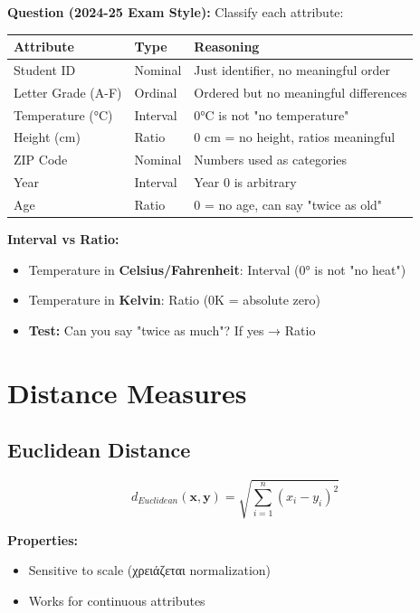 \begin{examplebox}
\textbf{Question (2024-25 Exam Style):} Classify each attribute:

\begin{center}
\begin{tabular}{lll}
\toprule
\textbf{Attribute} & \textbf{Type} & \textbf{Reasoning} \\
\midrule
Student ID & Nominal & Just identifier, no meaningful order \\
Letter Grade (A-F) & Ordinal & Ordered but no meaningful differences \\
Temperature (°C) & Interval & 0°C is not "no temperature" \\
Height (cm) & Ratio & 0 cm = no height, ratios meaningful \\
ZIP Code & Nominal & Numbers used as categories \\
Year & Interval & Year 0 is arbitrary \\
Age & Ratio & 0 = no age, can say "twice as old" \\
\bottomrule
\end{tabular}
\end{center}
\end{examplebox}

\begin{warningbox}
\textbf{Interval vs Ratio:}
\begin{itemize}
    \item Temperature in \textbf{Celsius/Fahrenheit}: Interval (0° is not "no heat")
    \item Temperature in \textbf{Kelvin}: Ratio (0K = absolute zero)
    \item \textbf{Test:} Can you say "twice as much"? If yes → Ratio
\end{itemize}
\end{warningbox}

\section{Distance Measures}

\subsection{Euclidean Distance}

\begin{formulabox}
\[
d_{Euclidean}(\mathbf{x}, \mathbf{y}) = \sqrt{\sum_{i=1}^{n} (x_i - y_i)^2}
\]

\textbf{Properties:}
\begin{itemize}
    \item Sensitive to scale (χρειάζεται normalization)
    \item Works for continuous attributes
\end{itemize}
\end{formulabox}

